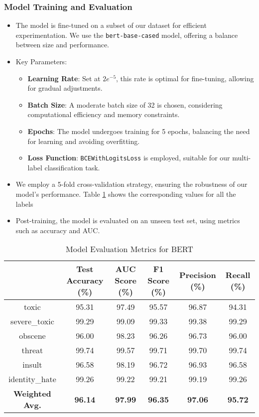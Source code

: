 \subsubsection{Model Training and Evaluation}
\begin{itemize}
    \item The model is fine-tuned on a subset of our dataset for efficient experimentation. We use the \texttt{bert-base-cased} model, offering a balance between size and performance.
    \item Key Parameters:
    \begin{itemize}
        \item \textbf{Learning Rate}: Set at $2e^{-5}$, this rate is optimal for fine-tuning, allowing for gradual adjustments.
        \item \textbf{Batch Size}: A moderate batch size of 32 is chosen, considering computational efficiency and memory constraints.
        \item \textbf{Epochs}: The model undergoes training for 5 epochs, balancing the need for learning and avoiding overfitting.
        \item \textbf{Loss Function}: \texttt{BCEWithLogitsLoss} is employed, suitable for our multi-label classification task.
    \end{itemize}
    \item We employ a 5-fold cross-validation strategy, ensuring the robustness of our model’s performance. Table \ref{tab:model_metrics_bert} shows the corresponding values for all the labels
    \item Post-training, the model is evaluated on an unseen test set, using metrics such as accuracy and AUC.


\end{itemize}

\begin{table}[h]
\centering
\begin{tabular}{|c|c|c|c|c|c|}
\hline
 & Test Accuracy (\%) & AUC Score (\%) & F1 Score (\%) & Precision (\%) & Recall (\%) \\
\hline
toxic & 95.31 & 97.49 & 95.57 & 96.87 & 94.31 \\
severe\_toxic & 99.29 & 99.09 & 99.33 & 99.38 & 99.29 \\
obscene & 96.00 & 98.23 & 96.26 & 96.73 & 96.00 \\
threat & 99.74 & 99.57 & 99.71 & 99.70 & 99.74 \\
insult & 96.58 & 98.19 & 96.72 & 96.93 & 96.58 \\
identity\_hate & 99.26 & 99.22 & 99.21 & 99.19 & 99.26 \\
\hline
\textbf{Weighted Avg.} & \textbf{96.14} & \textbf{97.99} & \textbf{96.35} & \textbf{97.06} & \textbf{95.72} \\
\hline
\end{tabular}
\caption{Model Evaluation Metrics for BERT}
\label{tab:model_metrics_bert}
\end{table}



